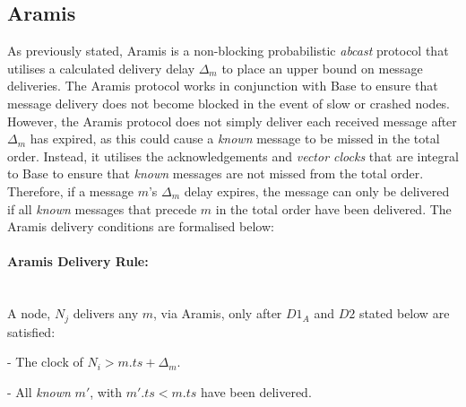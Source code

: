    \subsection{Aramis}
    As previously stated,  \textsf{Aramis} is a non-blocking probabilistic \emph{abcast} protocol that utilises a calculated delivery delay $\Delta_m$ to place an upper bound on message deliveries.  The \textsf{Aramis} protocol works in conjunction with \textsf{Base} to ensure that message delivery does not become blocked in the event of slow or crashed nodes.  However, the \textsf{Aramis} protocol does not simply deliver each received message after $\Delta_m$ has expired, as this could cause a \emph{known} message to be missed in the total order.  Instead, it utilises the acknowledgements and \emph{vector clocks} that are integral to \textsf{Base} to ensure that \emph{known} messages are not missed from the total order.  Therefore, if a message $m$'s $\Delta_m$ delay expires, the message can only be delivered if all \emph{known} messages that precede $m$ in the total order have been delivered.  The \textsf{Aramis} delivery conditions are formalised below:
    
    \paragraph{\textsf{Aramis} Delivery Rule:}\hspace{0pt} \\
	    A node, $N_j$ delivers any $m$, via \textsf{Aramis}, only after $D1_A$ and $D2$ stated below are satisfied:
	    \begin{description}[labelindent=1cm]
	        \item[$\boldsymbol{D1_A}$] - The clock of $N_i > m.ts + \Delta_{m}$. 
	        \item[$\boldsymbol{D2}$] - All \emph{known} $m'$, with $m'.ts < m.ts$ have been delivered.
	    \end{description}
    
    
